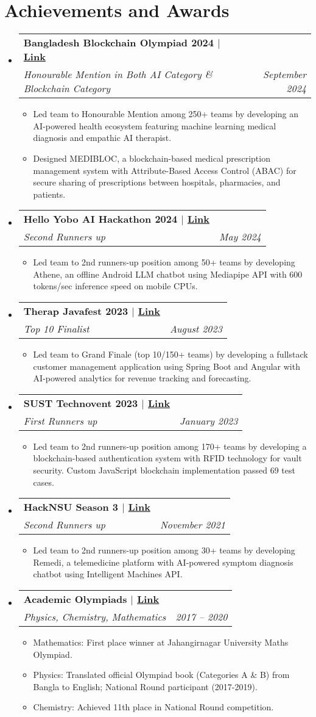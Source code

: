 \documentclass[letterpaper,12pt]{article} %
\makeatletter
\newcommand{\resumeItem}[1]{
  \item\small{
    {#1 \vspace{-2pt}}
  }
}
\newcommand{\resumeSubheading}[4]{
  \vspace{-2pt}\item
    \begin{tabular*}{0.97\textwidth}[t]{l@{\extracolsep{\fill}}r}
      \textbf{#1} & #2 \\
      \textit{\small#3} & \textit{\small #4} \\
    \end{tabular*}\vspace{-7pt}
}
\newcommand{\resumeSubHeadingListStart}{\begin{itemize}[leftmargin=0.15in, label={}]}
\newcommand{\resumeSubHeadingListEnd}{\end{itemize}}
\newcommand{\resumeItemListStart}{\begin{itemize}}
\newcommand{\resumeItemListEnd}{\end{itemize}\vspace{-5pt}}
\makeatother
\begin{document}
\section{Achievements and Awards}
\resumeSubHeadingListStart
    \resumeSubheading
      {Bangladesh Blockchain Olympiad 2024 $|$ \href{https://github.com/quvi007/Minimalist-HTTP-Server}{Link}}{}
      {Honourable Mention in Both AI Category \& Blockchain Category}{September 2024}
      \resumeItemListStart
        \resumeItem{Led team to Honourable Mention among 250+ teams by developing an AI-powered health ecosystem featuring machine learning medical diagnosis and empathic AI therapist.}
        \resumeItem{Designed MEDIBLOC, a blockchain-based medical prescription management system with Attribute-Based Access Control (ABAC) for secure sharing of prescriptions between hospitals, pharmacies, and patients.}
      \resumeItemListEnd
    \resumeSubheading
      {Hello Yobo AI Hackathon 2024 $|$ \href{https://github.com/quvi007/Minimalist-HTTP-Server}{Link}}{}
      {Second Runners up}{May 2024}
      \resumeItemListStart
        \resumeItem{Led team to 2nd runners-up position among 50+ teams by developing Athene, an offline Android LLM chatbot using Mediapipe API with 600 tokens/sec inference speed on mobile CPUs.}
      \resumeItemListEnd
    \resumeSubheading
      {Therap Javafest 2023 $|$ \href{https://github.com/quvi007/Minimalist-HTTP-Server}{Link}}{}
      {Top 10 Finalist}{August 2023}
      \resumeItemListStart
        \resumeItem{Led team to Grand Finale (top 10/150+ teams) by developing a fullstack customer management application using Spring Boot and Angular with AI-powered analytics for revenue tracking and forecasting.}
      \resumeItemListEnd
    \resumeSubheading
      {SUST Technovent 2023 $|$ \href{https://github.com/quvi007/Minimalist-HTTP-Server}{Link}}{}
      {First Runners up}{January 2023}
      \resumeItemListStart
        \resumeItem{Led team to 2nd runners-up position among 170+ teams by developing a blockchain-based authentication system with RFID technology for vault security. Custom JavaScript blockchain implementation passed 69 test cases.}
      \resumeItemListEnd
    \resumeSubheading
      {HackNSU Season 3 $|$ \href{https://github.com/quvi007/Minimalist-HTTP-Server}{Link}}{}
      {Second Runners up}{November 2021}
      \resumeItemListStart
        \resumeItem{Led team to 2nd runners-up position among 30+ teams by developing Remedi, a telemedicine platform with AI-powered symptom diagnosis chatbot using Intelligent Machines API.}
      \resumeItemListEnd
    \resumeSubheading
      {Academic Olympiads $|$ \href{https://github.com/quvi007/Minimalist-HTTP-Server}{Link}}{}
      {Physics, Chemistry, Mathematics}{2017 -- 2020}
      \resumeItemListStart
        \resumeItem{Mathematics: First place winner at Jahangirnagar University Maths Olympiad.}
        \resumeItem{Physics: Translated official Olympiad book (Categories A \& B) from Bangla to English; National Round participant (2017-2019).}
        \resumeItem{Chemistry: Achieved 11th place in National Round competition.}
      \resumeItemListEnd
\resumeSubHeadingListEnd
\end{document}
